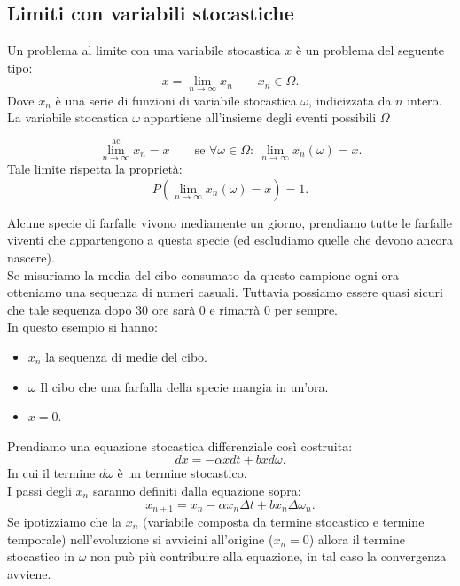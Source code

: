 \subsection{Limiti con variabili stocastiche}%
\label{sub:Limiti con variabili stocastiche}
Un problema al limite con una variabile stocastica $x$ è un problema del seguente tipo:
\[
    x = \lim_{n \to \infty} x_n \qquad x_n \in \Omega
.\] 
Dove $x_n$ è una serie di funzioni di variabile stocastica $\omega$, indicizzata da $n$ intero. \\
La variabile stocastica $\omega$ appartiene all'insieme degli eventi possibili $\Omega$
\begin{defn}[\textcolor{red}{Almost Certain Limit}]
 \[
    \lim^{\text{ac}}_{n \to \infty} x_n = x
    \qquad \text{se } \forall \omega \in \Omega: \
    \lim_{n \to \infty} x_n(\omega) = x
.\] 
Tale limite rispetta la proprietà:
\[
    P(\lim_{n \to \infty} x_n(\omega) =x) =1
.\] 
\end{defn}
\begin{exmp}[Farfalle]
    Alcune specie di farfalle vivono mediamente un giorno, prendiamo tutte le farfalle viventi che appartengono a questa specie (ed escludiamo quelle che devono ancora nascere).\\
    Se misuriamo la media del cibo consumato da questo campione ogni ora otteniamo una sequenza di numeri casuali.
    Tuttavia possiamo essere quasi sicuri che tale sequenza dopo 30 ore sarà 0 e rimarrà 0 per sempre.\\
    In questo esempio si hanno: 
    \begin{itemize}
        \item $x_n$ la sequenza di medie del cibo.
	\item $\omega$ Il cibo che una farfalla della specie mangia in un'ora.
	\item $x = 0$.
    \end{itemize} 
\end{exmp}
\begin{exmp}
    Prendiamo una equazione stocastica differenziale così costruita:
    \[
        dx = - \alpha x dt + bxd\omega
    .\] 
    In cui il termine $d\omega$ è un termine stocastico.\\
    I passi degli $x_n$ saranno definiti dalla equazione sopra:
    \[
        x_{n+1} = x_n - \alpha  x_n \Delta t + b x_n \Delta\omega_n
    .\] 
    Se ipotizziamo che la $x_n$ (variabile composta da termine stocastico e termine temporale)  nell'evoluzione si avvicini all'origine ($x_n = 0$) allora il termine stocastico in $\omega$ non può più contribuire alla equazione, in tal caso la convergenza avviene.
\end{exmp}
